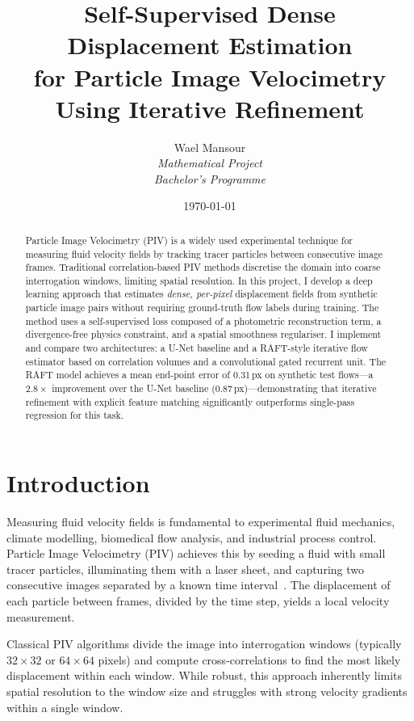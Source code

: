 \documentclass[11pt, a4paper]{article}
\title{Self-Supervised Dense Displacement Estimation\\for Particle Image Velocimetry\\Using Iterative Refinement}
\author{Wael Mansour\\[4pt]
\textit{Mathematical Project}\\
\textit{Bachelor's Programme}}
\date{\today}
\begin{document}
\maketitle

\begin{abstract}
Particle Image Velocimetry (PIV) is a widely used experimental technique for measuring fluid velocity fields by tracking tracer particles between consecutive image frames.
Traditional correlation-based PIV methods discretise the domain into coarse interrogation windows, limiting spatial resolution.
In this project, I develop a deep learning approach that estimates \emph{dense, per-pixel} displacement fields from synthetic particle image pairs without requiring ground-truth flow labels during training.
The method uses a self-supervised loss composed of a photometric reconstruction term, a divergence-free physics constraint, and a spatial smoothness regulariser.
I implement and compare two architectures: a U-Net baseline and a RAFT-style iterative flow estimator based on correlation volumes and a convolutional gated recurrent unit.
The RAFT model achieves a mean end-point error of 0.31\,px on synthetic test flows---a $2.8\times$ improvement over the U-Net baseline (0.87\,px)---demonstrating that iterative refinement with explicit feature matching significantly outperforms single-pass regression for this task.
\end{abstract}

\section{Introduction}
\label{sec:intro}

Measuring fluid velocity fields is fundamental to experimental fluid mechanics, climate modelling, biomedical flow analysis, and industrial process control.
Particle Image Velocimetry (PIV) achieves this by seeding a fluid with small tracer particles, illuminating them with a laser sheet, and capturing two consecutive images separated by a known time interval~\cite{adrian2011particle}.
The displacement of each particle between frames, divided by the time step, yields a local velocity measurement.

Classical PIV algorithms divide the image into interrogation windows (typically $32 \times 32$ or $64 \times 64$ pixels) and compute cross-correlations to find the most likely displacement within each window.
While robust, this approach inherently limits spatial resolution to the window size and struggles with strong velocity gradients within a single window.
\end{document}
